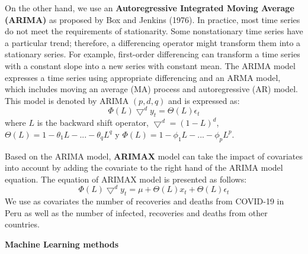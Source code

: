 \documentclass[12pt]{article}
\begin{document}
On the other hand, we use an \textbf{Autoregressive Integrated Moving Average (ARIMA)} as proposed by Box and Jenkins (1976). In practice, most time series do not meet the requirements of stationarity. Some nonstationary time series have a particular trend; therefore, a differencing operator might transform them into a stationary series. For example, first-order differencing can transform a time series with a constant slope into a new series with constant mean. The ARIMA model expresses a time series using appropriate differencing and an ARMA model, which includes moving an average (MA) process and autoregressive (AR) model. This model is denoted by ARIMA $(p, d, q)$ and is expressed as:
\begin{equation}
\Phi (L)\bigtriangledown^{d}y_t=\Theta (L)\epsilon_t
\end{equation}
where $L$ is the backward shift operator, $\bigtriangledown^{d}=(1-L)^{d}$, $\Theta (L)=1-\theta_1L-...-\theta_qL^q$ y $\Phi (L)=1-\phi_1L-...-\phi_pL^p$.

Based on the ARIMA model, \textbf{ARIMAX} model can take the impact of covariates into account by adding the covariate to the right hand of the ARIMA model equation. The equation of ARIMAX model is presented as follows:
\begin{equation}
\Phi (L)\bigtriangledown^{d}y_t=\mu+\Theta (L)x_t+\Theta (L)\epsilon_t
\end{equation}
We use as covariates the number of recoveries and deaths from COVID-19 in Peru as well as the number of infected, recoveries and deaths from other countries.

\textbf{Machine Learning methods}
\end{document}
